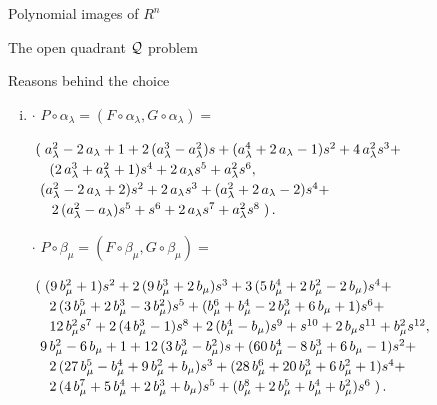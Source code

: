 \documentclass[11pt, a4paper, english, twoside, notitlepage]{report}
\begin{document}
\begin{chapter}{Polynomial images of $R^n$}
\begin{section}{The open quadrant $\mathcal{Q}$ problem}
\begin{subsection}{Reasons behind the choice}
\begin{enumerate}[(i)]
			\item $\cdot$ $P\circ\alpha_{\lambda}=(F\circ\alpha_{\lambda },G\circ\alpha_{\lambda})=$
			
				$\arraycolsep=2pt\def\arraystretch{1.2}
				\begin{array}{l}
					\left(\right.a_{\lambda}^{2}-2 \, a_{\lambda}+1+2 \, {(a_{\lambda}^{3} - a_{\lambda}^{2})} s+{(a_{\lambda}^{4} + 2 \, a_{\lambda} - 1)} s^{2}+4 \, a_{\lambda}^{2} s^{3}+\\
					\quad {(2 \, a_{\lambda}^{3} + a_{\lambda}^{2} + 1)} s^{4}+2 \, a_{\lambda} s^{5}+a_{\lambda}^{2} s^{6},	\\		
					\ {(a_{\lambda}^{2} - 2 \, a_{\lambda} + 2)} s^{2}+2 \, a_{\lambda} s^{3}+{(a_{\lambda}^{2} + 2 \, a_{\lambda} - 2)} s^{4} + \\
					\quad \, 2 \, {(a_{\lambda}^{2} - a_{\lambda})} s^{5}+s^{6}+2 \, a_{\lambda} s^{7}+a_{\lambda}^{2} s^{8}\left.\right).
				\end{array}
				$
				
				$\cdot$ $P\circ\beta_{\mu}=(F\circ\beta_{\mu},G\circ\beta_{\mu})=$
				
				$\arraycolsep=2pt\def\arraystretch{1.2}
				\begin{array}{l}
					\left(\right.{(9 \, b_{\mu}^{2} + 1)} s^{2}+2 \, {(9 \, b_{\mu}^{3} + 2 \,b_{\mu})} s^{3}+3 \, {(5 \, b_{\mu}^{4} + 2 \, b_{\mu}^{2} - 2 \, b_{\mu})}s^{4}+\\
					\quad 2 \, {(3 \, b_{\mu}^{5} + 2 \, b_{\mu}^{3} - 3 \, b_{\mu}^{2})}s^{5}+{(b_{\mu}^{6} + b_{\mu}^{4} - 2 \, b_{\mu}^{3} + 6 \, b_{\mu} + 1)} s^{6}+\\
					\quad 12 \,b_{\mu}^{2} s^{7}+2 \, {(4 \, b_{\mu}^{3} - 1)} s^{8}+2 \, {(b_{\mu}^{4} -b_{\mu})} s^{9} + s^{10} + 2 \, b_{\mu} s^{11}+b_{\mu}^{2} s^{12},\\
					\ 9 \, b_{\mu}^{2}-6 \, b_{\mu}+1+12 \, {(3 \, b_{\mu}^{3} - b_{\mu}^{2})} s+{(60\, b_{\mu}^{4} - 8 \, b_{\mu}^{3} + 6 \, b_{\mu} - 1)} s^{2} + \\
					\quad 2 \, {(27 \, b_{\mu}^{5}- b_{\mu}^{4} + 9 \, b_{\mu}^{2} + b_{\mu})} s^{3}+{(28 \, b_{\mu}^{6} + 20 \, b_{\mu}^{3}+ 6 \, b_{\mu}^{2} + 1)} s^{4}+\\
					\quad 2 \, {(4 \, b_{\mu}^{7} + 5 \, b_{\mu}^{4} + 2\, b_{\mu}^{3} + b_{\mu})} s^{5}+{(b_{\mu}^{8} + 2 \, b_{\mu}^{5} + b_{\mu}^{4} +b_{\mu}^{2})} s^{6}\left.\right).
					\end{array}
				$
					
		\end{enumerate}
		

\end{subsection}
\end{section}
\end{chapter}
\end{document}
